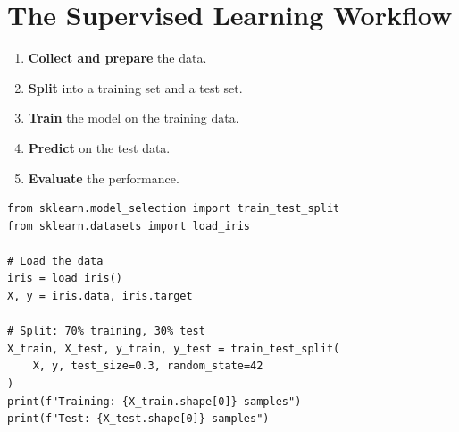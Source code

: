 \section{The Supervised Learning Workflow}
\label{sec:workflow_ml}


\begin{center}
\end{center}

\begin{enumerate}
    \item \textbf{Collect and prepare} the data.
    \item \textbf{Split} into a training set and a test set.
    \item \textbf{Train} the model on the training data.
    \item \textbf{Predict} on the test data.
    \item \textbf{Evaluate} the performance.
\end{enumerate}

\begin{codeblock}[title=\textbf{Python}]
\begin{verbatim}
from sklearn.model_selection import train_test_split
from sklearn.datasets import load_iris

# Load the data
iris = load_iris()
X, y = iris.data, iris.target

# Split: 70% training, 30% test
X_train, X_test, y_train, y_test = train_test_split(
    X, y, test_size=0.3, random_state=42
)
print(f"Training: {X_train.shape[0]} samples")
print(f"Test: {X_test.shape[0]} samples")
\end{verbatim}
\end{codeblock}

